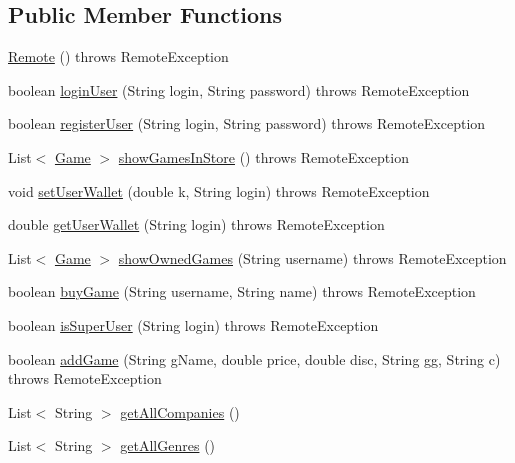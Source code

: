 \subsection*{Public Member Functions}
\begin{DoxyCompactItemize}
\item 
\hyperlink{classes_1_1deusto_1_1server_1_1remote_1_1_remote_a39055ae30196c2afe97a621b80e43374}{Remote} ()  throws Remote\+Exception 
\item 
boolean \hyperlink{classes_1_1deusto_1_1server_1_1remote_1_1_remote_a1c8e0153dd9b3f6d5499eb6d01e48bbe}{login\+User} (String login, String password)  throws Remote\+Exception 
\item 
boolean \hyperlink{classes_1_1deusto_1_1server_1_1remote_1_1_remote_a4b013f75d23e2c9f0dbca2d3bb467f6a}{register\+User} (String login, String password)  throws Remote\+Exception 
\item 
List$<$ \hyperlink{classes_1_1deusto_1_1server_1_1db_1_1data_1_1_game}{Game} $>$ \hyperlink{classes_1_1deusto_1_1server_1_1remote_1_1_remote_ae40a5882d6b3ef3d5928d87dafeb15fa}{show\+Games\+In\+Store} ()  throws Remote\+Exception 
\item 
void \hyperlink{classes_1_1deusto_1_1server_1_1remote_1_1_remote_aceab50768f98f50ff144b079f229c249}{set\+User\+Wallet} (double k, String login)  throws Remote\+Exception 	
\item 
double \hyperlink{classes_1_1deusto_1_1server_1_1remote_1_1_remote_af7cc190cccf69cda838a6d9805c5c2f5}{get\+User\+Wallet} (String login)  throws Remote\+Exception
\item 
List$<$ \hyperlink{classes_1_1deusto_1_1server_1_1db_1_1data_1_1_game}{Game} $>$ \hyperlink{classes_1_1deusto_1_1server_1_1remote_1_1_remote_a73569877f9317fc48a4e134977baa304}{show\+Owned\+Games} (String username)  throws Remote\+Exception 
\item 
boolean \hyperlink{classes_1_1deusto_1_1server_1_1remote_1_1_remote_ad9f8ad426b1162504b7b39eb1c86d2a3}{buy\+Game} (String username, String name)  throws Remote\+Exception 
\item 
boolean \hyperlink{classes_1_1deusto_1_1server_1_1remote_1_1_remote_ac7d2e76813b61b5a9fcf33d89b6e08c4}{is\+Super\+User} (String login)  throws Remote\+Exception 
\item 
boolean \hyperlink{classes_1_1deusto_1_1server_1_1remote_1_1_remote_a81c61e602f9419408e0069b51bc1e740}{add\+Game} (String g\+Name, double price, double disc, String gg, String c)  throws Remote\+Exception 
\item 
List$<$ String $>$ \hyperlink{classes_1_1deusto_1_1server_1_1remote_1_1_remote_aab476fc9723873e8f85296602d34a97a}{get\+All\+Companies} ()
\item 
List$<$ String $>$ \hyperlink{classes_1_1deusto_1_1server_1_1remote_1_1_remote_a7a276118f167e088bbb56d962b2cc18f}{get\+All\+Genres} ()
\end{DoxyCompactItemize}
